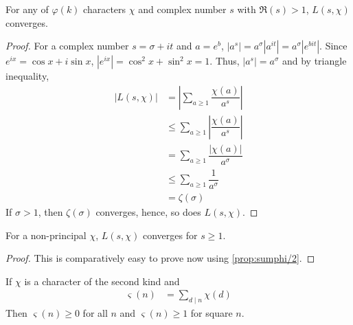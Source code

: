 \documentclass[elemannt.tex]{subfile}
\begin{document}
		\begin{proposition}
			For any of $\varphi(k)$ characters $\chi$ and complex number $s$ with $\mathfrak{R}(s)>1$, $L(s, \chi)$ converges.
		\end{proposition}

		\begin{proof}
			For a complex number $s=\sigma+it$ and $a=e^{b}$, $|a^{s}|=a^{\sigma}|a^{it}|=a^{\sigma}|e^{bit}|$. Since $e^{ix}=\cos{x}+i\sin{x}$, $|e^{ix}|=\cos^{2}{x}+\sin^{2}{x}=1$. Thus, $|a^{s}|=a^{\sigma}$ and by triangle inequality,
				\begin{align*}
					|L(s, \chi)|
						& = \left|\sum_{a\geq 1}\dfrac{\chi(a)}{a^{s}}\right|\\
						& \leq \sum_{a\geq 1}\left|\dfrac{\chi(a)}{a^{s}}\right|\\
						& = \sum_{a\geq 1}\dfrac{|\chi(a)|}{a^{\sigma}}\\
						& \leq \sum_{a\geq 1}\dfrac{1}{a^{\sigma}}\\
						& = \zeta(\sigma)
				\end{align*}
			If $\sigma > 1$, then $\zeta(\sigma)$ converges, hence, so does $L(s, \chi)$.
		\end{proof}

		\begin{proposition}\label{prop:nonprincipaldirichletconverges}
			For a non-principal $\chi$, $L(s, \chi)$ converges for $s\geq1$.
		\end{proposition}

		\begin{proof}
			This is comparatively easy to prove now using \autoref{prop:sumphi/2}.
		\end{proof}

		\begin{proposition}\label{pro:second-char-geq1}
			If $\chi$ is a character of the second kind and
				\begin{align*}
					\varsigma(n)
						& = \sum_{d\mid n}\chi(d)
				\end{align*}
			Then $\varsigma(n)\geq 0$ for all $n$ and $\varsigma(n)\geq 1$ for square $n$.
		\end{proposition}
\end{document}
